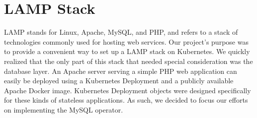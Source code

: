 \section{LAMP Stack}
LAMP stands for Linux, Apache, MySQL, and PHP, and refers to a stack of technologies commonly used
for hosting web services. Our project’s purpose was to provide a convenient way to set up a LAMP
stack on Kubernetes. We quickly realized that the only part of this stack that needed special
consideration was the database layer. An Apache server serving a simple PHP web application can
easily be deployed using a Kubernetes Deployment and a publicly available Apache Docker image.
Kubernetes Deployment objects were designed specifically for these kinds of stateless applications.
As such, we decided to focus our efforts on implementing the MySQL operator.
